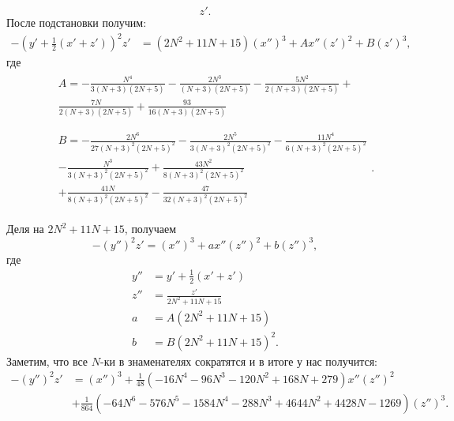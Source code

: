 \documentclass[a4paper,12pt]{article}
\theoremstyle{definition}
\begin{document}
\begin{itemize}[leftmargin=0.6cm]
\[        z'
        .\] 
        После подстановки получим:
        \begin{align*}
            -\left( y' + \frac{1}{2}(x' + z')  \right)^2 z' &= \left(2 N^2 + 11 N
            + 15\right) \left( x'' \right)^3 + A x'' \left( z' \right)^2 + B
            \left( z' \right)^3        
        ,\end{align*}
        где
        \begin{align*}
            &&\begin{split}
                A =   
                - \frac{N^4}{3 (N + 3) (2 N + 5)} - \frac{2
                N^3}{(N + 3) (2 N + 5)} - \frac{5 N^2}{2 (N + 3) (2 N + 5)} + \\
                \frac{7 N}{2 (N + 3) (2 N + 5)} + \frac{93}{16 (N + 3) (2 N +
                5)} 
            \end{split} \\ \\
            &&\begin{split}
                B =   - \frac{2 N^6}{27 (N + 3)^2 (2 N + 5)^2} -
                \frac{2 N^5}{3 (N + 3)^2 (2 N + 5)^2} - \frac{11 N^4}{6 (N + 3)^2 (2
                N + 5)^2} \\ - \frac{N^3}{3 (N + 3)^2 (2 N + 5)^2} + \frac{43 N^2}{8 (N
                + 3)^2 (2 N + 5)^2} \\ + \frac{41 N}{8 (N + 3)^2 (2 N + 5)^2} -
                \frac{47}{32 (N + 3)^2 (2 N + 5)^2}
            \end{split}
        .\end{align*}

        Деля на \(2 N^2 + 11 N + 15\), получаем
        \[
        -\left( y'' \right)^2 z' = (x'')^3 + a x'' \left( z'' \right)^2 + b \left(
        z'' \right)^3
        ,\] 
        где
        \begin{align*}
            y'' &=  y' + \frac{1}{2}(x' + z') \\
            z'' &= \frac{z'}{2 N^2 + 11 N + 15} \\
            a &= A \left( 2 N^2 + 11 N + 15 \right)\\
            b &= B \left( 2 N^2 + 11 N + 15 \right)^2
        .\end{align*}
        Заметим, что все \(N\)-ки в знаменателях сократятся и в итоге у нас
        получится:
        \begin{align*}
            -\left( y'' \right)^2 z' &= \left( x'' \right)^3  +  \frac{1}{48}
            \left(-16 N^4 - 96 N^3 - 120 N^2 + 168 N + 279\right) x'' \left( z''
            \right)^2 \\ 
            &+ \frac{1}{864} \left(-64 N^6 - 576 N^5 - 1584 N^4 - 288 N^3
            + 4644 N^2 + 4428 N - 1269\right) \left( z'' \right)^3
        .\end{align*}


\end{itemize}
\end{document}

